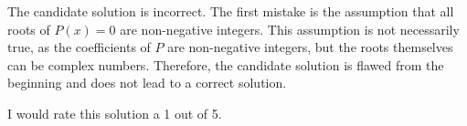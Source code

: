 The candidate solution is incorrect. The first mistake is the assumption that all roots of $P(x) = 0$ are non-negative integers. This assumption is not necessarily true, as the coefficients of $P$ are non-negative integers, but the roots themselves can be complex numbers. Therefore, the candidate solution is flawed from the beginning and does not lead to a correct solution. 

I would rate this solution a 1 out of 5.
